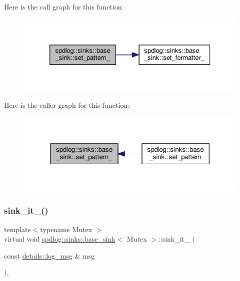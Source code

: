 Here is the call graph for this function\+:
\nopagebreak
\begin{figure}[H]
\begin{center}
\leavevmode
\includegraphics[width=326pt]{classspdlog_1_1sinks_1_1base__sink_a56bc5fc8e03dc0aeb6679856ffee7fb4_cgraph}
\end{center}
\end{figure}
Here is the caller graph for this function\+:
\nopagebreak
\begin{figure}[H]
\begin{center}
\leavevmode
\includegraphics[width=318pt]{classspdlog_1_1sinks_1_1base__sink_a56bc5fc8e03dc0aeb6679856ffee7fb4_icgraph}
\end{center}
\end{figure}
\mbox{\label{classspdlog_1_1sinks_1_1base__sink_ad698d300cb7f5e58b2aa1b9907cdbd87}} 
\subsubsection{\texorpdfstring{sink\+\_\+it\+\_\+()}{sink\_it\_()}}
{\footnotesize\ttfamily template$<$typename Mutex $>$ \\
virtual void \hyperlink{classspdlog_1_1sinks_1_1base__sink}{spdlog\+::sinks\+::base\+\_\+sink}$<$ Mutex $>$\+::sink\+\_\+it\+\_\+ (\begin{DoxyParamCaption}\item[{const \hyperlink{structspdlog_1_1details_1_1log__msg}{details\+::log\+\_\+msg} \&}]{msg }\end{DoxyParamCaption})\hspace{0.3cm}{\ttfamily [protected]}, {}}



